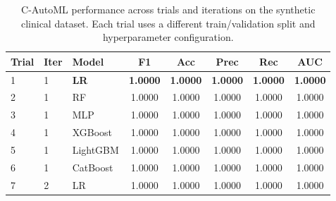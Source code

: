 \documentclass[diagnostics,article,accept,pdftex,moreauthors]{Definitions/mdpi}
\begin{document}
\begin{table}[H]
\caption{C-AutoML performance across trials and iterations on the
  synthetic clinical dataset. Each trial uses a different
  train/validation split and hyperparameter
  configuration.\label{tab:cautoml-synthetic-performance}}
\begin{tabularx}{\linewidth}{LLLCCCCC}
\toprule




\textbf{Trial} & \textbf{Iter} & \textbf{Model} &
\textbf{F1} & \textbf{Acc} & \textbf{Prec} & \textbf{Rec} & \textbf{AUC} \\
\midrule



1  & 1 & \textbf{LR}       & \textbf{1.0000} & \textbf{1.0000} & \textbf{1.0000} & \textbf{1.0000} & \textbf{1.0000} \\
2  & 1 & RF                & 1.0000 & 1.0000 & 1.0000 & 1.0000 & 1.0000 \\
3  & 1 & MLP               & 1.0000 & 1.0000 & 1.0000 & 1.0000 & 1.0000 \\
4  & 1 & XGBoost           & 1.0000 & 1.0000 & 1.0000 & 1.0000 & 1.0000 \\
5  & 1 & LightGBM          & 1.0000 & 1.0000 & 1.0000 & 1.0000 & 1.0000 \\
6  & 1 & CatBoost          & 1.0000 & 1.0000 & 1.0000 & 1.0000 & 1.0000 \\
7  & 2 & LR                & 1.0000 & 1.0000 & 1.0000 & 1.0000 & 1.0000 \\
\bottomrule
\end{tabularx}
\end{table}
\end{document}
